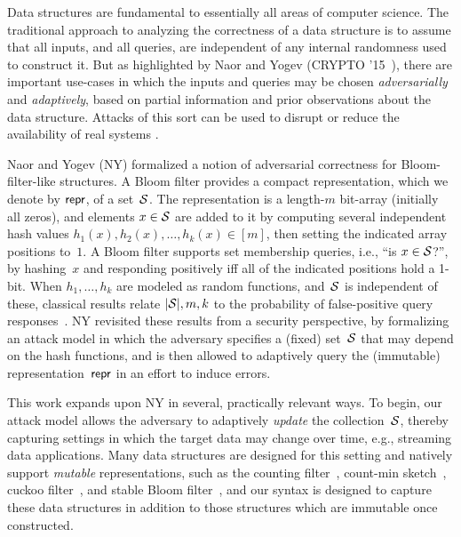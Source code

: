 Data structures are fundamental to essentially all areas of computer science.
The traditional approach to analyzing the correctness of a data structure is to
assume that all inputs, and all queries, are independent of any internal
randomness used to construct it.  But as highlighted by Naor and
Yogev (CRYPTO '15~\cite{naor2015bloom}), there are important use-cases in which the inputs
and queries may be chosen \emph{adversarially} and \emph{adaptively}, based on
partial information and prior observations about the data structure. Attacks of
this sort can be used to disrupt or reduce the availability of real systems
\cite{crosby2003denial,gerbet2015power,lipton1993clocked}.

Naor and Yogev (NY) formalized a notion of adversarial correctness for
Bloom-filter-like structures. A Bloom filter provides a compact representation,
which we denote by $\mathsf{repr}$, of a set~$\mathcal{S}$. The representation is a length-$m$
bit-array (initially all zeros), and elements $x \in \mathcal{S}$ are added to it by
computing several independent hash values $h_1(x),h_2(x),\ldots,h_k(x)\in [m]$, then setting the
indicated array positions to~$1$.  A Bloom filter supports set membership
queries, i.e., ``is $x\in\mathcal{S}$?'', by hashing~$x$ and responding positively iff
all of the indicated positions hold a 1-bit.  When $h_1,\ldots,h_k$ are modeled
as random functions, and~$\mathcal{S}$ is independent of these, classical results
relate $|\mathcal{S}|,m,k$ to the probability of false-positive query
responses~\cite{broder2004network,kirsch2006less}.
%
NY revisited these results from a security perspective, by
formalizing an attack model in which the adversary specifies a
(fixed) set~$\mathcal{S}$ that may
depend on the hash functions, and is then allowed to adaptively query the
(immutable) representation~$\mathsf{repr}$ in an effort to induce errors.

This work expands upon NY in several, practically relevant ways.  To begin, our
attack model allows the adversary to adaptively \emph{update} the
collection~$\mathcal{S}$, thereby capturing settings in which the target data may
change over time, e.g., streaming data applications. Many data structures are
designed for this setting and natively support \emph{mutable} representations,
such as the counting filter~\cite{fan2000summary}, count-min
sketch~\cite{cormode2005improved}, cuckoo filter~\cite{fan2014cuckoo}, and
stable Bloom filter~\cite{deng2006approximately}, and our syntax is designed to
capture these data structures in addition to those structures which are
immutable once constructed.

